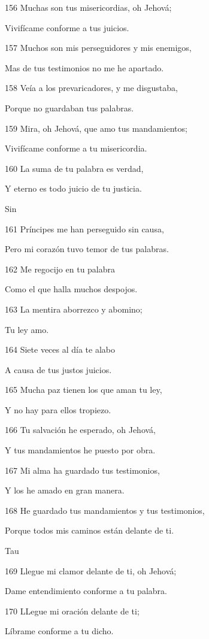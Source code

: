 \par 156 Muchas son tus misericordias, oh Jehová;
\par Vivifícame conforme a tus juicios.
\par 157 Muchos son mis perseguidores y mis enemigos,
\par Mas de tus testimonios no me he apartado.
\par 158 Veía a los prevaricadores, y me disgustaba,
\par Porque no guardaban tus palabras.
\par 159 Mira, oh Jehová, que amo tus mandamientos;
\par Vivifícame conforme a tu misericordia.
\par 160 La suma de tu palabra es verdad,
\par Y eterno es todo juicio de tu justicia.
\par Sin
\par 161 Príncipes me han perseguido sin causa,
\par Pero mi corazón tuvo temor de tus palabras.
\par 162 Me regocijo en tu palabra
\par Como el que halla muchos despojos.
\par 163 La mentira aborrezco y abomino;
\par Tu ley amo.
\par 164 Siete veces al día te alabo
\par A causa de tus justos juicios.
\par 165 Mucha paz tienen los que aman tu ley,
\par Y no hay para ellos tropiezo.
\par 166 Tu salvación he esperado, oh Jehová,
\par Y tus mandamientos he puesto por obra.
\par 167 Mi alma ha guardado tus testimonios,
\par Y los he amado en gran manera.
\par 168 He guardado tus mandamientos y tus testimonios,
\par Porque todos mis caminos están delante de ti.
\par Tau
\par 169 Llegue mi clamor delante de ti, oh Jehová;
\par Dame entendimiento conforme a tu palabra.
\par 170 LLegue mi oración delante de ti;
\par Líbrame conforme a tu dicho.
